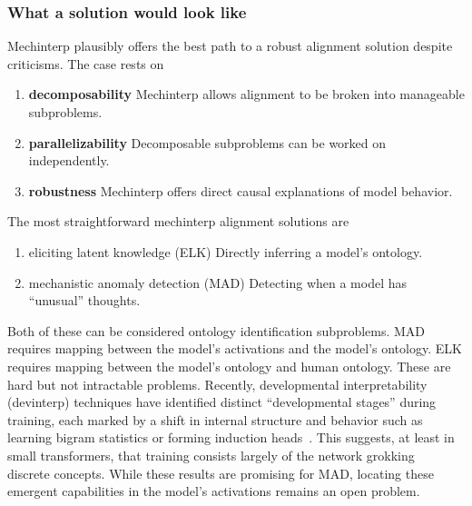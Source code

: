 \subsubsection{What a solution would look like}
Mechinterp plausibly offers the best path to a robust alignment
solution despite criticisms.
The case rests on
\begin{enumerate}
    \item \textbf{decomposability} Mechinterp allows alignment to be
    broken into manageable subproblems.
    \item \textbf{parallelizability} Decomposable subproblems can be
    worked on independently.
    \item \textbf{robustness} Mechinterp offers direct causal
    explanations of model behavior.
\end{enumerate}
The most straightforward mechinterp alignment solutions are
\begin{enumerate}
    \item eliciting latent knowledge (ELK)
    Directly inferring a model's ontology.
    \label{it:elk}
    \item mechanistic anomaly detection (MAD)
    Detecting when a model has ``unusual'' thoughts.
    \label{it:mad}
\end{enumerate}
Both of these can be considered
ontology identification subproblems. MAD requires mapping between the model's activations and
the model's ontology. ELK requires mapping between the model's ontology
and human ontology. These are hard but not intractable problems.
Recently, developmental interpretability
(devinterp) techniques have identified distinct ``developmental
stages'' during training, each marked by a shift in internal structure
and behavior such as learning bigram statistics or forming induction
heads~\cite{hoogland2024developmental}. This suggests, at least in small
transformers, that training consists largely of the network
grokking~\cite{nanda2023progress} discrete concepts. While these results
are promising for MAD, locating these emergent capabilities in the
model's activations remains an open problem.

